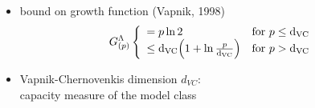 \begin{frame}





	
\end{frame}

\begin{frame}
	\begin{itemize}
		\item bound on growth function (Vapnik, 1998)
			\begin{equation*}
				G_{(p)}^\Lambda
				\left \{ \begin{array}{ll}
					= p \ln 2 
					& \text{for } p \leq \mathrm{d}_{\mathrm{VC}} \\
					\leq \mathrm{d}_{\mathrm{VC}} \Big( 1 + \ln \frac{p}{\mathrm{d}_{\mathrm{VC}}} \Big) 
					& \text{for } p > \mathrm{d}_{\mathrm{VC}}
				\end{array} \right.
			\end{equation*}

		\item Vapnik-Chernovenkis dimension $d_{VC}$: \\
			capacity measure of the model class
	\end{itemize}
\end{frame}

